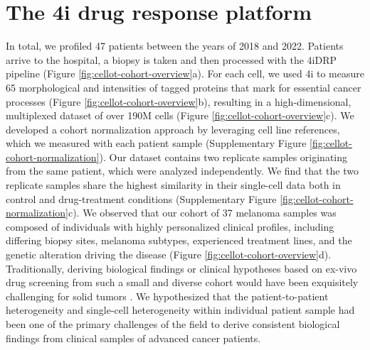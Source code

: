 \section{The 4i drug response platform}
In total, we profiled 47 patients between the years of 2018 and 2022.
Patients arrive to the hospital, a biopsy is taken and then processed with the 4iDRP pipeline (Figure \ref{fig:cellot-cohort-overview}a).
For each cell, we used 4i to measure 65 morphological and intensities of tagged proteins that mark for essential cancer processes (Figure \ref{fig:cellot-cohort-overview}b), resulting in a high-dimensional, multiplexed dataset of over 190M cells (Figure \ref{fig:cellot-cohort-overview}c).
We developed a cohort normalization approach by leveraging cell line references, which we measured with each patient sample (Supplementary Figure \ref{fig:cellot-cohort-normalization}).
Our dataset contains two replicate samples originating from the same patient, which were analyzed independently.
We find that the two replicate samples share the highest similarity in their single-cell data both in control and drug-treatment conditions (Supplementary Figure \ref{fig:cellot-cohort-normalization}c).
We observed that our cohort of 37 melanoma samples was composed of individuals with highly personalized clinical profiles, including differing biopsy sites, melanoma subtypes, experienced treatment lines, and the genetic alteration driving the disease (Figure \ref{fig:cellot-cohort-overview}d). 
Traditionally, deriving biological findings or clinical hypotheses based on ex-vivo drug screening from such a small and diverse cohort would have been exquisitely challenging for solid tumors \cite{williams2022}.
We hypothesized that the patient-to-patient heterogeneity and single-cell heterogeneity within individual patient sample had been one of the primary challenges of the field to derive consistent biological findings from clinical samples of advanced cancer patients.

